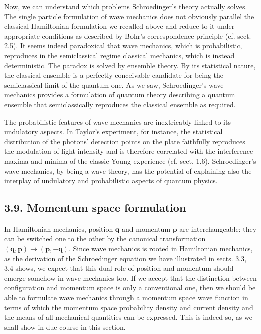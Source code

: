 \documentclass{article}
\begin{document}
Now, we can understand which problems Schroedinger's theory actually solves. The single particle formulation of wave mechanics does not obviously parallel the classical Hamiltonian formulation we recalled above and reduce to it under appropriate conditions as described by Bohr's correspondence principle (cf. sect. 2.5). It seems indeed paradoxical that wave mechanics, which is probabilistic, reproduces in the semiclassical regime classical mechanics, which is instead deterministic. The paradox is solved by ensemble theory. By its statistical nature, the classical ensemble is a perfectly conceivable candidate for being the semiclassical limit of the quantum one. As we saw, Schroedinger's wave mechanics provides a formulation of quantum theory describing a quantum ensemble that semiclassically reproduces the classical ensemble as required.

The probabilistic features of wave mechanics are inextricably linked to its undulatory aspects. In Taylor's experiment, for instance, the statistical distribution of the photons' detection points on the plate faithfully reproduces the modulation of light intensity and is therefore correlated with the interference maxima and minima of the classic Young experience (cf. sect. 1.6). Schroedinger's wave mechanics, by being a wave theory, has the potential of explaining also the interplay of undulatory and probabilistic aspects of quantum physics.

\subsection*{3.9. Momentum space formulation}

In Hamiltonian mechanics, position $\boldsymbol{q}$ and momentum $\boldsymbol{p}$ are interchangeable: they can be switched one to the other by the canonical transformation $(\boldsymbol{q}, \boldsymbol{p}) \rightarrow(\boldsymbol{p},-\boldsymbol{q})$. Since wave mechanics is rooted in Hamiltonian mechanics, as the derivation of the Schroedinger equation we have illustrated in sects. 3.3, 3.4 shows, we expect that this dual role of position and momentum should emerge somehow in wave mechanics too. If we accept that the distinction between configuration and momentum space is only a conventional one, then we should be able to formulate wave mechanics through a momentum space wave function in terms of which the momentum space probability density and current density and the means of all mechanical quantities can be expressed. This is indeed so, as we shall show in due course in this section.
\end{document}

